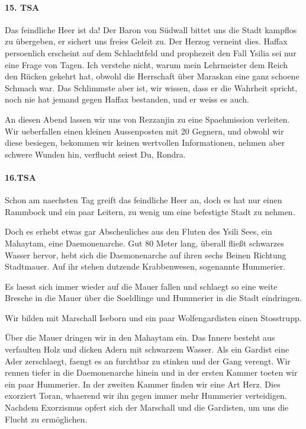 \paragraph{15. TSA}
Das feindliche Heer ist da!
Der Baron von Südwall bittet uns die Stadt kampflos zu übergeben, er sichert uns freies Geleit zu. Der Herzog verneint dies. Haffax persoenlich erscheint auf dem Schlachtfeld und prophezeit den Fall Ysilia sei nur eine Frage von Tagen.
Ich verstehe nicht, warum mein Lehrmeister dem Reich den Rücken gekehrt hat, obwohl die Herrschaft über Maraskan eine ganz schoene Schmach war. Das Schlimmste aber ist, wir wissen, dass er die Wahrheit spricht, noch nie hat jemand gegen Haffax bestanden, und er weiss es auch.

An diesen Abend lassen wir uns von Rezzanjin zu eine Spaehmission verleiten. Wir ueberfallen einen kleinen Aussenposten mit 20 Gegnern, und obwohl wir diese besiegen, bekommen wir keinen wertvollen Informationen, nehmen aber schwere Wunden hin, verflucht seiest Du, Rondra.

\paragraph{16.TSA}
Schon am naechsten Tag greift das feindliche Heer an, doch es hat nur einen Rammbock und ein paar Leitern, zu wenig um eine befestigte Stadt zu nehmen.

Doch es erhebt etwas gar Abscheuliches aus den Fluten des Ysili Sees, ein Mahaytam, eine Daemonenarche. Gut 80 Meter lang, überall fließt schwarzes Wasser hervor, hebt sich die Daemonenarche auf ihren sechs Beinen Richtung Stadtmauer. Auf ihr stehen dutzende Krabbenwesen, sogenannte Hummerier.

Es laesst sich immer wieder auf die Mauer fallen und schlaegt so eine weite Bresche in die Mauer über die Soeldlinge und Hummerier in die Stadt eindringen.

Wir bilden mit Marschall Iseborn und ein paar Wolfengardisten einen Stosstrupp.

Über die Mauer dringen wir in den Mahaytam ein. Das Innere besteht aus verfaulten Holz und dicken Adern mit schwarzem Wasser. Als ein Gardist eine Ader zerschlaegt, faengt es an furchtbar zu stinken und der Gang verengt. Wir rennen tiefer in die Daemonenarche hinein und in der ersten Kammer toeten wir ein paar Hummerier. In der zweiten Kammer finden wir eine Art Herz. Dies exorziert Toran, whaerend wir ihn gegen immer mehr Hummerier verteidigen. Nachdem Exorzismus opfert sich der Marschall und die Gardisten, um uns die Flucht zu ermöglichen.

